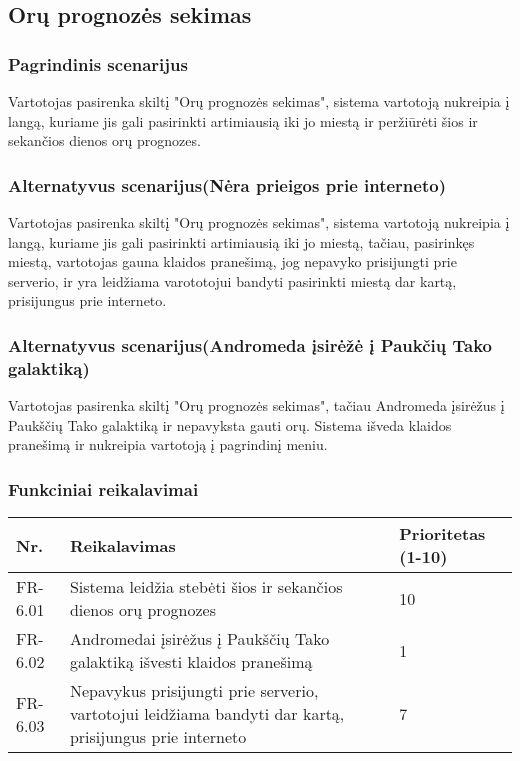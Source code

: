 \documentclass[oneside]{VUMIFPSkursinis}
\begin{document}
\subsection{Orų prognozės sekimas}
\subsubsection{Pagrindinis scenarijus}
	Vartotojas pasirenka skiltį "Orų prognozės sekimas", sistema vartotoją nukreipia į langą, kuriame jis gali pasirinkti artimiausią iki jo miestą ir peržiūrėti šios ir sekančios dienos orų prognozes.
\subsubsection{Alternatyvus scenarijus(Nėra prieigos prie interneto)}
	Vartotojas pasirenka skiltį "Orų prognozės sekimas", sistema vartotoją nukreipia į langą, kuriame jis gali pasirinkti artimiausią iki jo miestą, tačiau, pasirinkęs miestą, vartotojas gauna klaidos pranešimą, jog nepavyko prisijungti prie serverio, ir yra leidžiama varototojui bandyti pasirinkti miestą dar kartą, prisijungus prie interneto.
\subsubsection{Alternatyvus scenarijus(Andromeda įsirėžė į Paukčių Tako galaktiką)}
	Vartotojas pasirenka skiltį "Orų prognozės sekimas", tačiau Andromeda įsirėžus į Paukščių Tako galaktiką ir nepavyksta gauti orų. Sistema išveda klaidos pranešimą ir nukreipia vartotoją į pagrindinį meniu.
\subsubsection{Funkciniai reikalavimai}
\begin{table}[htbp]
	\begin{tabularx}{1\textwidth}{ |P{2.5cm}|X|P{3cm }| }  \hline
           	Nr. & Reikalavimas &  Prioritetas (1-10)  \\   \hline 
         		FR-6.01 & Sistema leidžia stebėti šios ir sekančios dienos orų prognozes & 10  \\   \hline
			FR-6.02 & Andromedai įsirėžus į Paukščių Tako galaktiką išvesti klaidos pranešimą & 1 \\  \hline
			FR-6.03 & Nepavykus prisijungti prie serverio, vartotojui leidžiama bandyti dar kartą, prisijungus prie interneto & 7 \\ \hline
	\end{tabularx}
\end{table}
\end{document}
